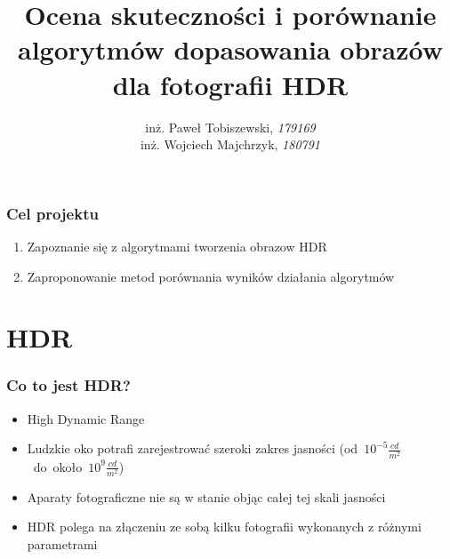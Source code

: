 \documentclass{beamer}
\title{Ocena skuteczności i porównanie algorytmów dopasowania obrazów dla fotografii HDR}
\author[]{inż. Paweł Tobiszewski, \emph{179169}\\inż. Wojciech Majchrzyk, \emph{180791}}
\institute[PWr]{Politechnika Wrocławska, Wydział Informatyki i Zarządzania}
\begin{document}
\begin{frame}
	\titlepage
\end{frame}


\begin{frame}
	\frametitle{Cel projektu}
	\begin{enumerate}
		\item Zapoznanie się z algorytmami tworzenia obrazow HDR
		\item Zaproponowanie metod porównania wyników działania algorytmów
	\end{enumerate}
\end{frame}

\section{HDR}
\begin{frame}
	\frametitle{Co to jest HDR?}
	\begin{itemize}
		\item High Dynamic Range
		\item Ludzkie oko potrafi zarejestrować szeroki zakres jasności (od~$10^{-5}\frac{cd}{m^2}$~do~około~$10^9\frac{cd}{m^2}$)
		\item Aparaty fotograficzne nie są w stanie objąc całej tej skali jasności
		\item HDR polega na złączeniu ze sobą kilku fotografii wykonanych z różnymi parametrami
	\end{itemize}
\end{frame}
\end{document}
